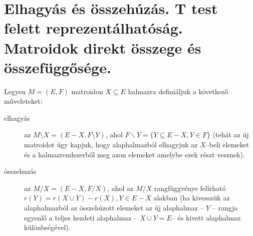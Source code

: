 \skiptooddpage\section[Elhagyás, összehúzás,
  összeg,reprezentálhatóság]{Elhagyás és összehúzás. T test felett reprezentálhatóság.
  Matroidok direkt összege és összefüggősége.}


Legyen $M=(E,F)$ matroidon $X \subseteq E$ halmazra definiáljuk a következő
műveleteket:
\begin{description}
	\item[elhagyás] az $M \setminus X=(E-X, F \setminus Y)$, ahol $F \backslash
		      Y=\{Y\subseteq E-X, Y \in F\}$ (tehát az új matroidot úgy kapjuk, hogy
	      alaphalmazból elhagyjuk az $X$--beli elemeket és a halmazrendszerből meg azon
	      elemeket amelybe ezek részt vesznek).
	\item[összehuzás]  az $M / X=(E-X, F / X)$, ahol az $M/X$ rangfüggvénye felírható
	      $r(Y)=r(X \cup Y) - r(X), Y \in  E-X$ alakban (ha kivesszük az alaphalmazból az
	      összehúzott elemeket az új alaphalmaz -- $Y$ -- rangja egyenlő a teljes kezdeti alaphalmaz
	      -- $X \cup Y = E$-- és kivett alaphalmaz különbségével).
\end{description}

